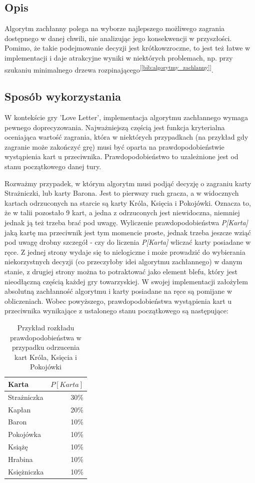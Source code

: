 \subsection{Opis}
Algorytm zachłanny polega na wyborze najlepszego możliwego zagrania dostępnego w danej chwili, nie analizując jego konsekwencji w przyszłości. Pomimo, że takie podejmowanie decyzji jest krótkowzroczne, to jest też łatwe w implementacji i daje atrakcyjne wyniki w niektórych problemach, np. przy szukaniu minimalnego drzewa rozpinającego\textsuperscript{[\ref{bib:algorytmy_zachlanny}]}.

\subsection{Sposób wykorzystania}

W kontekście gry 'Love Letter', implementacja algorytmu zachłannego wymaga pewnego doprecyzowania. Najważniejszą częścią jest funkcja kryterialna oceniająca wartość zagrania, która w niektórych przypadkach (na przykład gdy zagranie może zakończyć grę) musi być oparta na prawdopodobieństwie wystąpienia kart u przeciwnika. Prawdopodobieństwo to uzależnione jest od stanu początkowego danej tury.

Rozważmy przypadek, w którym algorytm musi podjąć decyzję o zagraniu karty Strażniczki, lub karty Barona. Jest to pierwszy ruch gracza, a w widocznych kartach odrzuconych na starcie są karty Króla, Księcia i Pokojówki. Oznacza to, że w talii pozostało 9 kart, a jedna z odrzuconych jest niewidoczna, niemniej jednak ją też trzeba brać pod uwagę. Wyliczenie prawdopodobieństwa \textit{P[Karta]} jaką kartę ma przeciwnik jest tym momencie proste, jednak trzeba jeszcze wziąć pod uwagę drobny szczegół - czy do liczenia \textit{P[Karta]} wliczać karty posiadane w ręce. Z jednej strony wydaje się to nielogiczne i może prowadzić do wybierania niekorzystnych decyzji (co przeczyłoby idei algorytmu zachłannego) w danym stanie, z drugiej strony można to potraktować jako element blefu, który jest nieodłączną częścią każdej gry towarzyskiej. W swojej implementacji założyłem absolutną zachłanność algorytmu i karty posiadane na ręce są pomijane w obliczeniach. 
Wobec powyższego, prawdopodobieństwa wystąpienia kart u przeciwnika wynikające z ustalonego stanu początkowego są następujące:

\begin{table}[h]
	\caption{Przykład rozkładu prawdopodobieństwa w przypadku odrzucenia kart Króla, Księcia i Pokojówki}
	\centering
		\begin{tabular}{|l|r|}
			\hline
			\bf{Karta} & $P[Karta]$	\\ \hline
			Strażniczka & 30\% 			\\ \hline
			Kapłan & 20\% 				\\ \hline
			Baron & 10\% 				\\ \hline
			Pokojówka & 10\% 			\\ \hline
			Książę & 10\% 				\\ \hline
			Hrabina & 10\% 				\\ \hline
			Księżniczka & 10\% 			\\ \hline
		\end{tabular}
\end{table}

